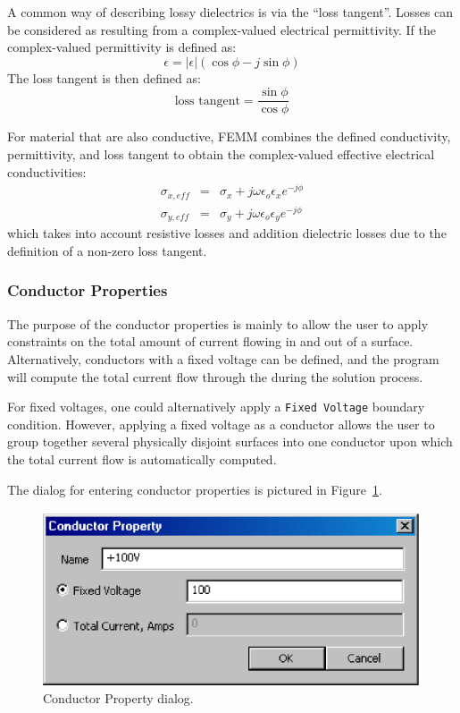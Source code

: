 A common way of describing lossy dielectrics is via the ``loss tangent''.
Losses can be considered as resulting from a complex-valued electrical permittivity.
If the complex-valued permittivity is defined as:
\begin{equation}
\epsilon = \left| \epsilon \right| \left( \cos \phi - j \sin \phi \right)
\end{equation}
The loss tangent is then defined as:
\begin{equation} \mbox{loss tangent} = \frac{\sin \phi}{\cos \phi} \end{equation}

For material that are also conductive, FEMM combines the defined conductivity, permittivity,
and loss tangent to obtain the complex-valued effective electrical conductivities:
\begin{eqnarray}
\sigma_{x,eff} & = & \sigma_x + j \omega \epsilon_o \epsilon_x e^{-j \phi} \\ \nonumber
\sigma_{y,eff} & = & \sigma_y + j \omega \epsilon_o \epsilon_y e^{-j \phi}
\end{eqnarray}
which takes into account resistive losses and addition dielectric losses due to the
definition of a non-zero loss tangent.

\subsubsection{Conductor Properties}

The purpose of the conductor properties is mainly to allow the user to apply
constraints on the total amount of current flowing in and out of a surface.
Alternatively, conductors with a fixed voltage can be defined, and the
program will compute the total current flow through the during the
solution process.

For fixed voltages, one could alternatively apply a \texttt{Fixed
Voltage} boundary condition. However, applying a fixed voltage
as a conductor allows the user to group together several physically
disjoint surfaces into one conductor upon which the total current flow 
is automatically computed.

The dialog for entering conductor properties is pictured in
Figure~\ref{cfig12}.

\begin{figure}[htbp]
\centerline{\includegraphics{cd5.ps}}
\caption{Conductor Property dialog.}
\label{cfig12}
\end{figure}


